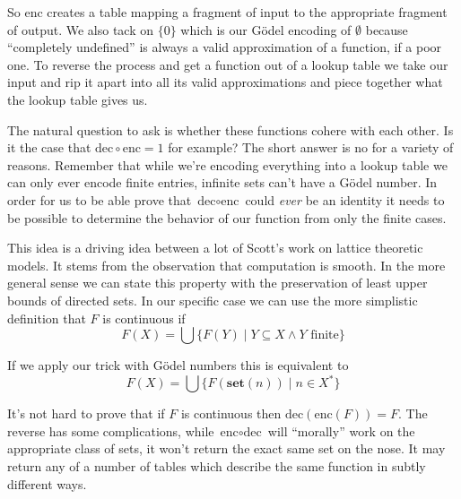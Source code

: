 \documentclass{amsart}
\newcommand{\set}[1]{\ensuremath{\mathbf{set}(#1)}}
\newcommand{\enc}{\text{enc}}
\newcommand{\dec}{\text{dec}}
\begin{document}
So $\enc$ creates a table mapping a fragment of input to the
appropriate fragment of output. We also tack on $\{0\}$ which is our
G\"odel encoding of $\emptyset$ because ``completely undefined'' is
always a valid approximation of a function, if a poor one. To reverse
the process and get a function out of a lookup table we take our input
and rip it apart into all its valid approximations and piece together
what the lookup table gives us.

The natural question to ask is whether these functions cohere with
each other. Is it the case that $\dec \circ \enc = 1$ for example?
The short answer is no for a variety of reasons. Remember that while
we're encoding everything into a lookup table we can only ever encode
finite entries, infinite sets can't have a G\"odel number. In order
for us to be able prove that $\dec \circ \enc$ could \emph{ever} be an
identity it needs to be possible to determine the behavior of our
function from only the finite cases.

This idea is a driving idea between a lot of Scott's work on lattice
theoretic models. It stems from the observation that computation is
smooth. In the more general sense we can state this property with the
preservation of least upper bounds of directed sets. In our specific
case we can use the more simplistic definition that $F$ is continuous
if
\[
  F(X) = \bigcup \{F(Y) \mid Y \subseteq X \wedge Y \text{ finite}\}
\]

If we apply our trick with G\"odel numbers this is equivalent to
\[
  F(X) = \bigcup \{F(\set{n}) \mid n \in X^*\}
\]

It's not hard to prove that if $F$ is continuous then
$\dec(\enc(F)) = F$. The reverse has some complications, while
$\enc \circ \dec$ will ``morally'' work on the appropriate class of
sets, it won't return the exact same set on the nose. It may return
any of a number of tables which describe the same function in subtly
different ways.
\end{document}

